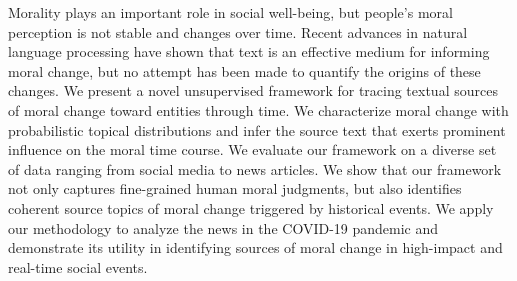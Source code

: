 Morality plays an important role in social well-being, but people's moral perception is not stable and changes over time. Recent advances in natural language processing have shown that text is an effective medium for informing moral change, but no attempt has been made to quantify the origins of these changes. We present a novel unsupervised framework for tracing textual sources of moral change toward entities through time. We characterize moral change with probabilistic topical distributions and infer the source text that exerts prominent influence on the moral time course. We evaluate our framework on a diverse set of data ranging from social media to news articles. We show that our framework not only captures fine-grained human moral judgments, but also identifies coherent source topics of moral change triggered by historical events. We apply our methodology to analyze the news in the COVID-19 pandemic and demonstrate its utility in identifying sources of moral change in high-impact and real-time social events.
